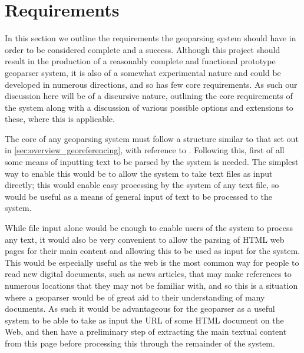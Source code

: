 \documentclass[12pt, a4paper]{report}
\begin{document}
\section{Requirements}
\label{sec:requirements}


In this section we outline the requirements the geoparsing system should have in order to be considered complete and a success. Although this project should result in the production of a reasonably complete and functional prototype geoparser system, it is also of a somewhat experimental nature and could be developed in numerous directions, and so has few core requirements. As such our discussion here will be of a discursive nature, outlining the core requirements of the system along with a discussion of various possible options and extensions to these, where this is applicable. 



The core of any geoparsing system must follow a structure similar to that set out in \ref{sec:overview_georeferencing}, with reference to \citet{hill2006}. Following this, first of all some means of inputting text to be parsed by the system is needed. The simplest way to enable this would be to allow the system to take text files as input directly; this would enable easy processing by the system of any text file, so would be useful as a means of general input of text to be processed to the system.

While file input alone would be enough to enable users of the system to process any text, it would also be very convenient to allow the parsing of HTML web pages for their main content and allowing this to be used as input for the system. This would be especially useful as the web is the most common way for people to read new digital documents, such as news articles, that may make references to numerous locations that they may not be familiar with, and so this is a situation where a geoparser would be of great aid to their understanding of many documents. As such it would be advantageous for the geoparser as a useful system to be able to take as input the URL of some HTML document on the Web, and then have a preliminary step of extracting the main textual content from this page before processing this through the remainder of the system.
\end{document}
